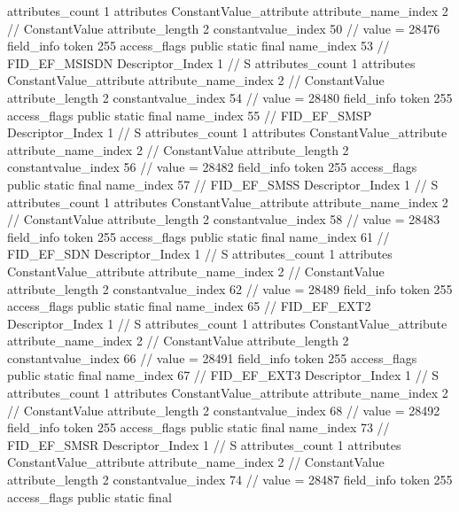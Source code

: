 {{{{{				attributes_count	1
				attributes {
				ConstantValue_attribute {
					attribute_name_index	2		// ConstantValue
					attribute_length	2
					constantvalue_index	50		// value = 28476
				}
				}
			}
			field_info {
				token	255
				access_flags	public static final
				name_index	53		// FID_EF_MSISDN
				Descriptor_Index	1		// S
				attributes_count	1
				attributes {
				ConstantValue_attribute {
					attribute_name_index	2		// ConstantValue
					attribute_length	2
					constantvalue_index	54		// value = 28480
				}
				}
			}
			field_info {
				token	255
				access_flags	public static final
				name_index	55		// FID_EF_SMSP
				Descriptor_Index	1		// S
				attributes_count	1
				attributes {
				ConstantValue_attribute {
					attribute_name_index	2		// ConstantValue
					attribute_length	2
					constantvalue_index	56		// value = 28482
				}
				}
			}
			field_info {
				token	255
				access_flags	public static final
				name_index	57		// FID_EF_SMSS
				Descriptor_Index	1		// S
				attributes_count	1
				attributes {
				ConstantValue_attribute {
					attribute_name_index	2		// ConstantValue
					attribute_length	2
					constantvalue_index	58		// value = 28483
				}
				}
			}
			field_info {
				token	255
				access_flags	public static final
				name_index	61		// FID_EF_SDN
				Descriptor_Index	1		// S
				attributes_count	1
				attributes {
				ConstantValue_attribute {
					attribute_name_index	2		// ConstantValue
					attribute_length	2
					constantvalue_index	62		// value = 28489
				}
				}
			}
			field_info {
				token	255
				access_flags	public static final
				name_index	65		// FID_EF_EXT2
				Descriptor_Index	1		// S
				attributes_count	1
				attributes {
				ConstantValue_attribute {
					attribute_name_index	2		// ConstantValue
					attribute_length	2
					constantvalue_index	66		// value = 28491
				}
				}
			}
			field_info {
				token	255
				access_flags	public static final
				name_index	67		// FID_EF_EXT3
				Descriptor_Index	1		// S
				attributes_count	1
				attributes {
				ConstantValue_attribute {
					attribute_name_index	2		// ConstantValue
					attribute_length	2
					constantvalue_index	68		// value = 28492
				}
				}
			}
			field_info {
				token	255
				access_flags	public static final
				name_index	73		// FID_EF_SMSR
				Descriptor_Index	1		// S
				attributes_count	1
				attributes {
				ConstantValue_attribute {
					attribute_name_index	2		// ConstantValue
					attribute_length	2
					constantvalue_index	74		// value = 28487
				}
				}
			}
			field_info {
				token	255
				access_flags	public static final
}}}}}
